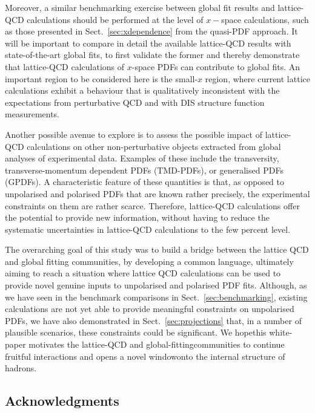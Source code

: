 Moreover, a similar benchmarking exercise between global fit results and lattice-QCD calculations should
be performed at the level of
$x-$space calculations, such as those presented in Sect.~\ref{sec:xdependence}
from the quasi-PDF approach.
%
It will be important to compare in detail the available lattice-QCD results with
state-of-the-art global fits, to first validate the former and
thereby demonstrate that lattice-QCD calculations of $x$-space PDFs can contribute to
global fits.
%
An important region to be considered here is the small-$x$ region, where current lattice
calculations exhibit a behaviour that is qualitatively inconsistent with
the expectations from perturbative QCD and with DIS structure function measurements.

Another possible avenue to explore is to assess
the possible impact of lattice-QCD calculations on other non-perturbative objects
extracted from global analyses of experimental data.
%
Examples of these include the transversity, transverse-momentum dependent PDFs (TMD-PDFs),
or generalised PDFs (GPDFs).
%
A characteristic feature of these quantities is that, as opposed to unpolarised and
polarised PDFs that are known rather precisely, the experimental constraints on them
are rather scarce. Therefore, lattice-QCD calculations offer the potential
to provide new information, without having to reduce the systematic uncertainties 
in lattice-QCD calculations to the few percent level.

The overarching goal of this study was to build a bridge between the lattice QCD
and global fitting communities, by developing a common language, ultimately
aiming to reach a situation where
lattice QCD calculations can be used to provide novel genuine inputs
to unpolarised and polarised PDF fits.
%
Although, as we have seen in the benchmark comparisons in Sect.~\ref{sec:benchmarking}, 
existing calculations are not yet able to provide meaningful constraints on unpolarised
PDFs, we have also demonstrated in Sect.~\ref{sec:projections} that, in a number
of plausible scenarios, these constraints could be significant.
%
​We​ ​hope​ ​this​ ​white-paper​ ​motivates​ ​the​ ​lattice-QCD​ ​and​ ​global-fitting​ ​communities​ ​to​ ​continue
fruitful​ ​interactions​ ​and​ ​opens​ ​a​ ​novel​ ​window​ ​onto​ ​the​ ​internal​ ​structure​ ​of​ ​hadrons.



\subsection*{Acknowledgments}

